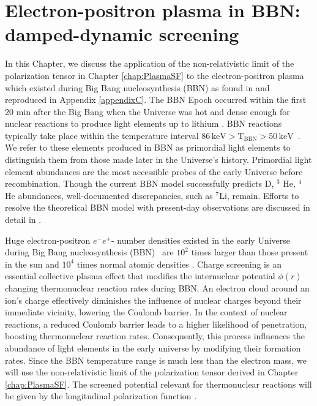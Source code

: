 \chapter{Electron-positron plasma in BBN: damped-dynamic screening}\label{chap:bbn}

In this Chapter, we discuss the application of the non-relativistic limit of the polarization tensor in Chapter \ref{chap:PlasmaSF} to the electron-positron plasma which existed during Big Bang nucleosynthesis (BBN) as found in \citep{Grayson:2023flr} and reproduced in Appendix \ref{appendixC}. The BBN Epoch occurred within the first 20 min after the Big Bang when the Universe was hot and dense enough for nuclear reactions to produce light elements up to lithium \citep{Pitrou:2018cgg}. BBN reactions typically take place within the temperature interval $86\, \mathrm{keV}>\mathrm{T_{BBN}}>50\, \mathrm{keV}$~\citep{Pitrou:2018cgg}. We refer to these elements produced in BBN as primordial light elements to distinguish them from those made later in the Universe's history. Primordial light element abundances are the most accessible probes of the early Universe before recombination. Though the current BBN model successfully predicts D, $^3$ He, $^4$ He abundances, well-documented discrepancies, such as $^7$Li, remain. Efforts to resolve the theoretical BBN model with present-day observations are discussed in detail in \citep{Pitrou:2021vqr,Bertulani:2022qly}.

Huge electron-positron $e^-e^+$- number densities existed in the early Universe during Big Bang nucleosynthesis (BBN)~\citep{ Wang:2010px, Hwang:2021kno, Rafelski:2023emw} are $10^2$ times larger than those present in the sun \citep{bahcall2001solar} and $10^4$ times normal atomic densities \citep{Grayson:2023flr}. Charge screening is an essential collective plasma effect that modifies the internuclear potential $\phi(r)$ changing thermonuclear reaction rates during BBN. An electron cloud around an ion's charge effectively diminishes the influence of nuclear charges beyond their immediate vicinity, lowering the Coulomb barrier. In the context of nuclear reactions, a reduced Coulomb barrier leads to a higher likelihood of penetration, boosting thermonuclear reaction rates. Consequently, this process influences the abundance of light elements in the early universe by modifying their formation rates. Since the BBN temperature range is much less than the electron mass, we will use the non-relativistic limit of the polarization tensor derived in Chapter \ref{chap:PlasmaSF}. The screened potential relevant for thermonuclear reactions will be given by the longitudinal polarization function .

